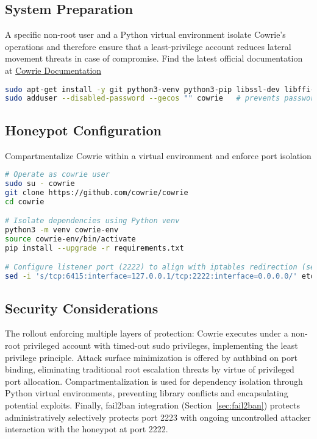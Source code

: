 \documentclass{cls/ULBreport}
\begin{document}
    \subsection{System Preparation}
    A specific non-root user and a Python virtual environment isolate Cowrie's operations and therefore ensure that a least-privilege account reduces lateral movement threats in case of compromise. Find the latest official documentation at \href{https://docs.cowrie.org/en/latest/INSTALL.html}{Cowrie Documentation}
    \begin{lstlisting}[language=bash,caption={Cowrie User Creation}]
sudo apt-get install -y git python3-venv python3-pip libssl-dev libffi-dev build-essential libpython3-dev authbind # to bind privileged ports without root priv
sudo adduser --disabled-password --gecos "" cowrie   # prevents password-based connections 
    \end{lstlisting}

    \subsection{Honeypot Configuration}
    Compartmentalize Cowrie within a virtual environment and enforce port isolation
    \begin{lstlisting}[language=bash,caption={Cowrie Honeypot Setup}]
# Operate as cowrie user
sudo su - cowrie  
git clone https://github.com/cowrie/cowrie  
cd cowrie  

# Isolate dependencies using Python venv
python3 -m venv cowrie-env  
source cowrie-env/bin/activate  
pip install --upgrade -r requirements.txt  

# Configure listener port (2222) to align with iptables redirection (section 2.3)
sed -i 's/tcp:6415:interface=127.0.0.1/tcp:2222:interface=0.0.0.0/' etc/cowrie.cfg  
    \end{lstlisting}


\subsection{Security Considerations}  
The rollout enforcing multiple layers of protection: Cowrie executes under a non-root privileged account with timed-out sudo privileges, implementing the least privilege principle. Attack surface minimization is offered by authbind on port binding, eliminating traditional root escalation threats by virtue of privileged port allocation. Compartmentalization is used for dependency isolation through Python virtual environments, preventing library conflicts and encapsulating potential exploits. Finally, fail2ban integration (Section~\ref{sec:fail2ban}) protects administratively selectively protects port 2223 with ongoing uncontrolled attacker interaction with the honeypot at port 2222. 
\end{document}
